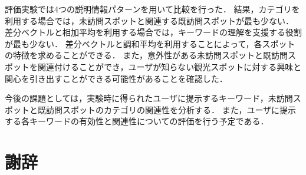\documentclass{deimj}
\begin{document}
評価実験では4つの説明情報パターンを用いて比較を行った．
結果，カテゴリを利用する場合では，未訪問スポットと関連する既訪問スポットが最も少ない．
差分ベクトルと相加平均を利用する場合では，キーワードの理解を支援する役割が最も少ない．
差分ベクトルと調和平均を利用することによって，各スポットの特徴を求めることができる．
また，意外性がある未訪問スポットと既訪問スポットを関連付けることができ，ユーザが知らない観光スポットに対する興味と関心を引き出すことができる可能性があることを確認した．

今後の課題としては，実験時に得られたユーザに提示するキーワード，未訪問スポットと既訪問スポットのカテゴリの関連性を分析する．
また，ユーザに提示する各キーワードの有効性と関連性についての評価を行う予定である．


\section*{謝辞}
\end{document}
